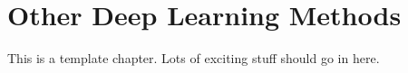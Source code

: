\chapter{Other Deep Learning Methods}
This is a template chapter. Lots of exciting stuff should go in here.
